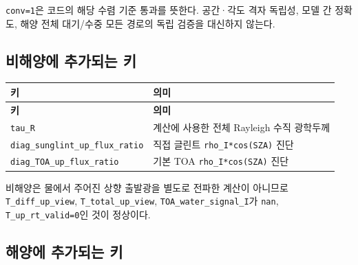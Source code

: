 \texttt{conv=\allowbreak{}1}은 코드의 해당 수렴 기준 통과를 뜻한다. 공간·각도 격자 독립성, 모델 간 정확도, 해양 전체 대기/수중 모든 경로의 독립 검증을 대신하지 않는다.

\subsection{비해양에 추가되는 키}
\label{sec:auto:05_output_formats:4.2}

{\TableFont
\begin{longtable}{@{}>{\raggedright\arraybackslash}p{}>{\raggedright\arraybackslash}p{}@{}}
\toprule
\textbf{키} & \textbf{의미} \\
\midrule
\endfirsthead
\toprule
\textbf{키} & \textbf{의미} \\
\midrule
\endhead
\bottomrule
\endfoot
\texttt{tau\_\allowbreak{}R} & 계산에 사용한 전체 Rayleigh 수직 광학두께 \\
\texttt{diag\_\allowbreak{}sunglint\_\allowbreak{}up\_\allowbreak{}flux\_\allowbreak{}ratio} & 직접 글린트 \texttt{rho\_\allowbreak{}I*cos(SZA)} 진단 \\
\texttt{diag\_\allowbreak{}TOA\_\allowbreak{}up\_\allowbreak{}flux\_\allowbreak{}ratio} & 기본 TOA \texttt{rho\_\allowbreak{}I*cos(SZA)} 진단 \\
\end{longtable}
}

비해양은 물에서 주어진 상향 출발광을 별도로 전파한 계산이 아니므로 \texttt{T\_\allowbreak{}diff\_\allowbreak{}up\_\allowbreak{}view}, \texttt{T\_\allowbreak{}total\_\allowbreak{}up\_\allowbreak{}view}, \texttt{TOA\_\allowbreak{}water\_\allowbreak{}signal\_\allowbreak{}I}가 \texttt{nan}, \texttt{T\_\allowbreak{}up\_\allowbreak{}rt\_\allowbreak{}valid=\allowbreak{}0}인 것이 정상이다.

\subsection{해양에 추가되는 키}
\label{sec:auto:05_output_formats:4.3}

